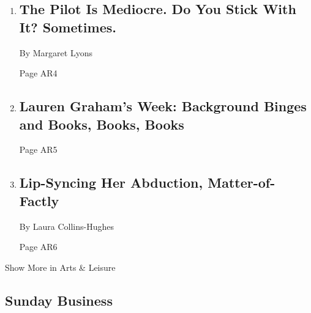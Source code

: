 \begin{enumerate}
\def\labelenumi{\arabic{enumi}.}
\item
  \href{/2020/02/11/arts/television/pilots-schitts-creek-monk.html}{}

  \hypertarget{the-pilot-is-mediocre-do-you-stick-with-it-sometimes}{%
  \subsection{The Pilot Is Mediocre. Do You Stick With It?
  Sometimes.}\label{the-pilot-is-mediocre-do-you-stick-with-it-sometimes}}

  By Margaret Lyons

  Page AR4
\item
  \href{/2020/02/12/arts/television/lauren-graham-books.html}{}

  \hypertarget{lauren-grahams-week-background-binges-and-books-books-books}{%
  \subsection{Lauren Graham's Week: Background Binges and Books, Books,
  Books}\label{lauren-grahams-week-background-binges-and-books-books-books}}

  Page AR5
\item
  \href{/2020/02/12/theater/lip-syncing-her-abduction-matter-of-factly.html}{}

  \hypertarget{lip-syncing-her-abduction-matter-of-factly}{%
  \subsection{Lip-Syncing Her Abduction,
  Matter-of-Factly}\label{lip-syncing-her-abduction-matter-of-factly}}

  By Laura Collins-Hughes

  Page AR6
\end{enumerate}

Show More in Arts \& Leisure

\hypertarget{sunday-business}{%
\subsection{Sunday Business}\label{sunday-business}}


